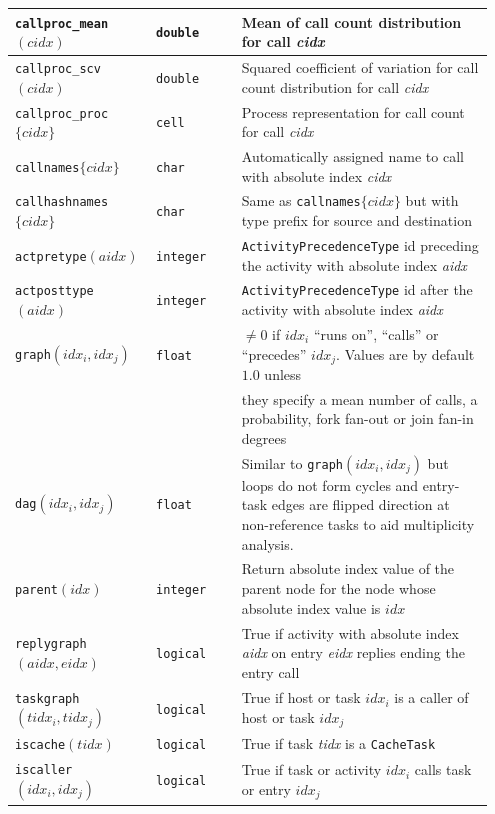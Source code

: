 \begin{MATLAB}
{\begin{longtable}{|p{0.28\linewidth}|p{0.17\linewidth}|p{0.50\linewidth}|}
\texttt{callproc\_mean}$(cidx)$ & \texttt{double} & Mean of call count distribution for call \textit{cidx} \\\hline
\texttt{callproc\_scv}$(cidx)$ & \texttt{double} & Squared coefficient of variation for call count distribution for call \textit{cidx} \\\hline
\texttt{callproc\_proc}$\{cidx\}$ & \texttt{cell} & Process representation for call count for call \textit{cidx} \\\hline
\texttt{callnames}$\{cidx\}$ &  \texttt{char} & Automatically assigned name to call with absolute index \textit{cidx} \\\hline
\texttt{callhashnames}$\{cidx\}$ &  \texttt{char} & Same as \texttt{callnames}$\{cidx\}$ but with type prefix for source and destination \\\hline
\texttt{actpretype}$(aidx)$ &  \texttt{integer} & \texttt{ActivityPrecedenceType} id preceding the activity with absolute index \textit{aidx} \\\hline
\texttt{actposttype}$(aidx)$ &  \texttt{integer} & \texttt{ActivityPrecedenceType} id after the activity with absolute index \textit{aidx} \\\hline
\texttt{graph}$(idx_i,idx_j)$ & \texttt{float} & $\neq 0$ if ${idx_i}$ ``runs on'', ``calls'' or ``precedes'' ${idx_j}$. Values are by default $1.0$ unless\\
  & & they specify a mean number of calls, a probability, fork fan-out or join fan-in degrees\\\hline
\texttt{dag}$(idx_i,idx_j)$ & \texttt{float} & Similar to \texttt{graph}$(idx_i,idx_j)$ but loops do not form cycles and entry-task edges are flipped direction at non-reference tasks to aid multiplicity analysis.\\  \hline
\texttt{parent}$(idx)$ & \texttt{integer} & Return absolute index value of the parent node for the node whose
absolute index value is $idx$\\\hline
\texttt{replygraph}$(aidx,eidx)$ & \texttt{logical} & True if activity with absolute index \textit{aidx} on entry \textit{eidx} replies ending the entry call\\\hline
\texttt{taskgraph}$(tidx_i,tidx_j)$ & \texttt{logical} & True if host or task $idx_i$ is a caller of host or task $idx_j$\\\hline
\texttt{iscache}$(tidx)$ &  \texttt{logical} & True if task \textit{tidx} is a \texttt{CacheTask}\\\hline
\texttt{iscaller}$(idx_i,idx_j)$ &  \texttt{logical} &True if task or activity ${idx_i}$ calls task or entry ${idx_j}$\\\hline

\end{longtable}}
\end{MATLAB}
